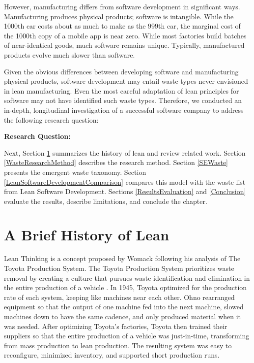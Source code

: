 However, manufacturing differs from software development in significant ways. Manufacturing produces physical products; software is intangible. While the 1000th car costs about as much to make as the 999th car, the marginal cost of the 1000th copy of a mobile app is near zero. While most factories build batches of near-identical goods, much software remains unique. Typically, manufactured products evolve much slower than software.

 
Given the obvious differences between developing software and manufacturing physical products, software development may entail waste types never envisioned in lean manufacturing. Even the most careful adaptation of lean principles for software may not have identified such waste types. Therefore, we conducted an in-depth, longitudinal investigation of a successful software company to address the following research question: 

\textbf{Research Question: }

Next, Section \ref{HistoryOfLean} summarizes the history of lean and review related work. Section \ref{WasteResearchMethod} describes the research method. Section \ref{SEWaste} presents the emergent waste taxonomy. Section \ref{LeanSoftwareDevelopmentComparison} compares this model with the waste list from Lean Software Development. Sections \ref{ResultsEvaluation} and \ref{Conclusion} evaluate the results, describe limitations, and conclude the chapter.

\section{A Brief History of Lean}
\label{HistoryOfLean}
Lean Thinking is a concept proposed by Womack \cite{WomackLeanThinking} following his analysis of The Toyota Production System. The Toyota Production System prioritizes waste removal by creating a culture that pursues waste identification and elimination in the entire production of a vehicle \cite{OhnoToyotaProductionSystem, ShingoToyotaProductionSystem}. In 1945, Toyota optimized for the production rate of each system, keeping like machines near each other. Ohno rearranged equipment so that the output of one machine fed into the next machine, slowed machines down to have the same cadence, and only produced material when it was needed. After optimizing Toyota's factories, Toyota then trained their suppliers so that the entire production of a vehicle was just-in-time, transforming from mass production to lean production. The resulting  system was easy to reconfigure, minimized inventory, and supported short production runs.  

